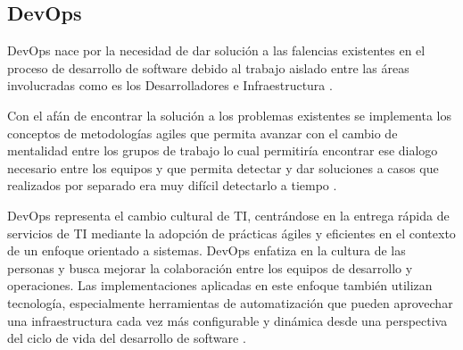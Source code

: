 \subsection{DevOps}
DevOps nace por la necesidad de dar solución a las falencias existentes en el proceso de desarrollo de software debido al trabajo aislado entre las áreas involucradas como es los Desarrolladores e Infraestructura \cite{4599477}.

Con el afán de encontrar la solución a los problemas existentes se implementa los conceptos de metodologías agiles que permita avanzar con el cambio de mentalidad entre los grupos de trabajo lo cual permitiría encontrar ese dialogo necesario entre los equipos y que permita detectar y dar soluciones a casos que realizados por separado era muy difícil detectarlo a tiempo \cite{4599477}.

DevOps representa el cambio cultural de TI, centrándose en la entrega rápida de servicios de TI mediante la adopción de prácticas ágiles y eficientes en el contexto de un enfoque orientado a sistemas. DevOps enfatiza en la cultura de las personas y busca mejorar la colaboración entre los equipos de desarrollo y operaciones. Las implementaciones aplicadas en este enfoque también utilizan tecnología, especialmente herramientas de automatización que pueden aprovechar una infraestructura cada vez más configurable y dinámica desde una perspectiva del ciclo de vida del desarrollo de software \cite{AZAD2023107150}.